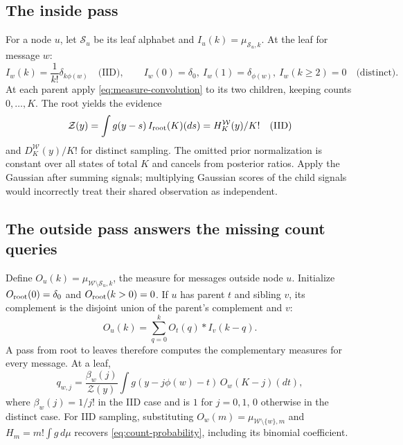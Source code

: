 \documentclass[10pt,a4paper]{article}
\newcommand{\calW}{\mathcal W}
\begin{document}
\subsection{The inside pass}
For a node $u$, let $\mathcal S_u$ be its leaf alphabet and $I_u(k)=\mu_{\mathcal S_u,k}$.
At the leaf for message $w$:
\begin{equation}
 I_w(k)=\frac1{k!}\delta_{k\phi(w)}\quad\text{(IID)},\qquad
 I_w(0)=\delta_0,\ I_w(1)=\delta_{\phi(w)},\ I_w(k\geq2)=0\quad\text{(distinct)}.
 \label{eq:leaf}
\end{equation}
At each parent apply \eqref{eq:measure-convolution} to its two children, keeping counts $0,\ldots,K$.
The root yields the evidence
\begin{equation}
 \mathcal Z(y)=\int g(y-s)\,I_{\rm root}(K)(ds)
 =H_K^{\calW}(y)/K!\quad\text{(IID)}
 \label{eq:tree-evidence}
\end{equation}
and $D_K^{\calW}(y)/K!$ for distinct sampling. The omitted prior normalization is constant over all states
of total $K$ and cancels from posterior ratios. Apply the Gaussian after summing signals; multiplying
Gaussian scores of the child signals would incorrectly treat their shared observation as independent.

\clearpage
\subsection{The outside pass answers the missing count queries}
Define $O_u(k)=\mu_{\calW\setminus\mathcal S_u,k}$, the measure for messages outside node $u$.
Initialize $O_{\rm root}(0)=\delta_0$ and $O_{\rm root}(k>0)=0$.
If $u$ has parent $t$ and sibling $v$, its complement is the disjoint union of the parent's complement and $v$:
\begin{equation}
 \boxed{O_u(k)=\sum_{q=0}^k O_t(q)*I_v(k-q).}
 \label{eq:outside}
\end{equation}
A pass from root to leaves therefore computes the complementary measures for every message.
At a leaf,
\begin{equation}
 \boxed{q_{w,j}=\frac{\beta_w(j)}{\mathcal Z(y)}
       \int g(y-j\phi(w)-t)\,O_w(K-j)(dt),}
 \label{eq:tree-query}
\end{equation}
where $\beta_w(j)=1/j!$ in the IID case and is $1$ for $j=0,1$, $0$ otherwise in the distinct case.
For IID sampling, substituting $O_w(m)=\mu_{\calW\setminus\{w\},m}$ and
$H_m=m!\int g\,d\mu$ recovers \eqref{eq:count-probability}, including its binomial coefficient.
\end{document}
